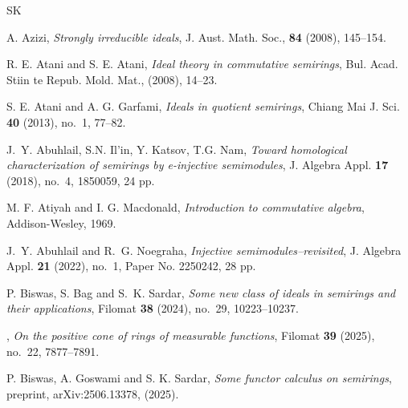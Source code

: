 \documentclass[11pt,english]{amsart}
\theoremstyle{definition}
\numberwithin{equation}{section}
\begin{document}
\smallskip 
\begin{thebibliography}{SK}


 A. Azizi, \textit{Strongly irreducible ideals}, J. Aust. Math. Soc., \textbf{84} (2008), 145--154.

 R. E. Atani and S. E. Atani, \textit{Ideal theory in commutative semirings}, Bul. Acad. Stiin te Repub. Mold. Mat., (2008), 14--23.

 S. E. Atani and A. G. Garfami, \textit{Ideals in quotient semirings}, Chiang Mai J. Sci. {\bf 40} (2013), no.~1, 77--82.

 J.~Y. Abuhlail, S.N. Il'in, Y. Katsov, T.G. Nam, \textit{Toward homological characterization of semirings by e-injective semimodules}, J. Algebra Appl. {\bf 17} (2018), no.~4, 1850059, 24 pp.

 M. F. Atiyah and I. G. Macdonald, \textit{Introduction to commutative algebra}, Addison-Wesley, 1969.

 J.~Y. Abuhlail and R.~G. Noegraha, \textit{Injective semimodules--revisited}, J. Algebra Appl. {\bf 21} (2022), no.~1, Paper No. 2250242, 28 pp.



 P. Biswas, S. Bag and S.~K. Sardar, \textit{Some new class of ideals in semirings and their applications}, Filomat {\bf 38} (2024), no.~29, 10223--10237.

 \bysame, \textit{On the positive cone of rings of measurable functions}, Filomat {\bf 39} (2025), no.~22, 7877--7891.

 P. Biswas, A. Goswami and S. K. Sardar, \textit{Some functor calculus on semirings}, preprint, arXiv:2506.13378, (2025).



\end{thebibliography}
\end{document}
